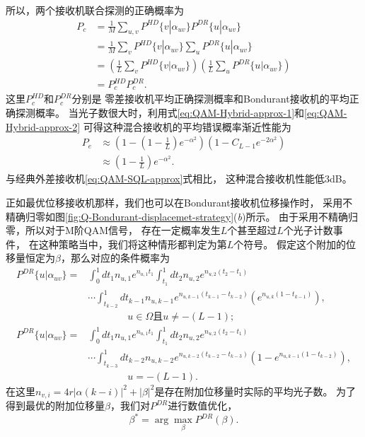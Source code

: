 所以，两个接收机联合探测的正确概率为
\begin{equation}
\begin{split}
P_c &= \frac{1}{M} \sum_{u,v} P^{HD}\{v| \alpha_{uv}\} P^{DR}\{u|\alpha_{uv}\} \\
    &= \frac{1}{M} \sum_v P^{HD}\{v| \alpha_{uv}\} \sum_u P^{DR}\{u|\alpha_{uv}\} \\
    &= \left( \frac{1}{L} \sum_v P^{HD}\{v| \alpha_{uv}\} \right) \left( \frac{1}{L} \sum_u P^{DR}\{u|\alpha_{uv}\} \right) \\
    &= P_c^{HD} P_c^{DR}.
\end{split}
\end{equation}
这里$P_c^{HD}$和$P_c^{DR}$分别是
零差接收机平均正确探测概率和Bondurant接收机的平均正确探测概率。
当光子数很大时，利用式\ref{eq:QAM-Hybrid-approx-1}和\ref{eq:QAM-Hybrid-approx-2}
可得这种混合接收机的平均错误概率渐近性能为
\begin{equation}
\begin{split}
P_e & \approx \left(1 - (1-\frac{1}{L}) e^{-\alpha^2} \right) \left( 1 - C_{L-1} e^{-2\alpha^2} \right)  \\
    & \approx (1-\frac{1}{L}) e^{-\alpha^2}.
\end{split}
\end{equation}
与经典外差接收机\ref{eq:QAM-SQL-approx}式相比，
这种混合接收机性能低3dB。




正如最优位移接收机那样，我们也可以在Bondurant接收机位移操作时，
采用不精确归零如图\ref{fig:Q-Bondurant-displacemet-strategy}(\textit{b})所示。
由于采用不精确归零，所以对于M阶QAM信号，
存在一定概率发生$L$个甚至超过$L$个光子计数事件，
在这种策略当中，我们将这种情形都判定为第$L$个符号。
假定这个附加的位移量恒定为$\beta$，那么对应的条件概率为
\begin{equation}
\begin{split}
P^{DR}\{u|\alpha_{uv}\} = & \int_0^1 dt_1 n_{u,1} e^{n_{u,1} t_1} \int_{t_1}^1 dt_2 n_{u,2} e^{n_{u,2} (t_2-t_1)} \\
                          & \cdots \int_{t_{k-2}}^1 dt_{k-1} n_{u,k-1} e^{n_{u,k-1} (t_{k-1}-t_{k-2})} \left( e^{n_{u,k} (1-t_{k-1})}\right), \\
                          & \qquad \qquad u \in \Omega \text{且} u \neq -(L-1);   \\
P^{DR}\{u|\alpha_{uv}\} = & \int_0^1 dt_1 n_{u,1} e^{n_{u,1} t_1} \int_{t_1}^1 dt_2 n_{u,2} e^{n_{u,2} (t_2-t_1)} \\
                          & \cdots \int_{t_{k-3}}^1 dt_{k-2} n_{u,k-2} e^{n_{u,k-2} (t_{k-2}-t_{k-3})} \left( 1 - e^{n_{u,k-1} (1-t_{k-2})}\right),  \\
                          & \qquad \qquad u = -(L-1).
\end{split}
\label{eq:DR-cond-p-2}
\end{equation}
在这里$n_{v,i} = 4r|\alpha(k-i)|^2 + |\beta|^2$是存在附加位移量时实际的平均光子数。
为了得到最优的附加位移量$\beta$，我们对$P^{DR}$进行数值优化，
\begin{equation}
\beta^* = \arg\max_{\beta} P^{DR}(\beta).
\end{equation}

